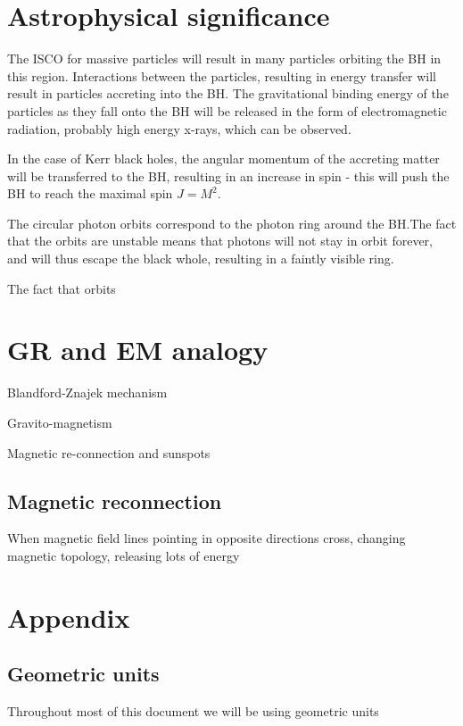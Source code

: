 \section{Astrophysical significance}\label{sec:Astrophysical significance}

The ISCO for massive particles will result in many particles orbiting the BH in this region. Interactions between the particles, resulting in energy transfer will result in particles accreting into the BH. The gravitational binding energy of the particles as they fall onto the BH will be released in the form of electromagnetic radiation, probably high energy x-rays, which can be observed.

In the case of Kerr black holes, the angular momentum of the accreting matter will be transferred to the BH, resulting in an increase in spin - this will push the BH to reach the maximal spin $J=M^2$.

The circular photon orbits correspond to the photon ring around the BH.The fact that the orbits are unstable means that photons will not stay in orbit forever, and will thus escape the black whole, resulting in a faintly visible ring.

The fact that orbits 


\section{GR and EM analogy}

Blandford-Znajek mechanism

Gravito-magnetism

Magnetic re-connection and sunspots

\subsection{Magnetic reconnection}

When magnetic field lines pointing in opposite directions cross, changing magnetic topology, releasing lots of energy 

\section{Appendix}

\subsection{Geometric units}

Throughout most of this document we will be using geometric units


